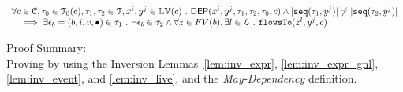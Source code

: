 \begin{lem}
	\label{lem:diffctl_inv}
	\[
		\begin{array}{l}
			\forall c \in \mathcal{C}, \mathtt{\tau}_0 \in \mathcal{T}_0(c), \mathtt{\tau}_1, \mathtt{\tau}_2 \in \mathcal{T}, x^i, y^j \in \mathbb{LV}(c) ~.~ 
		\mathsf{DEP}(x^i, y^j, \mathtt{\tau}_1, \mathtt{\tau}_2 , \mathtt{\tau}_0, c) \land
		|\mathtt{seq}(\mathtt{\tau}_1, y^j)| \neq |\mathtt{seq}(\mathtt{\tau}_2, y^j)|
		\\ \quad  \implies
		\exists \mathtt{\epsilon}_b = (b, i, v, \bullet) \in \mathtt{\tau}_1 ~.~ \neg \mathtt{\epsilon}_b \in \mathtt{\tau}_2
		\land 
		\forall z \in FV(b), \exists l \in \mathcal{L} ~.~ \mathtt{flowsTo}(z^l, y^j, c)
	\end{array}
	\]
\end{lem} 
Proof Summary:
\\
Proving by using the Inversion Lemmas~\ref{lem:inv_expr}, \ref{lem:inv_expr_gnl}, 
\ref{lem:inv_event}, and \ref{lem:inv_live}, and the \emph{May-Dependency} definition.
%
